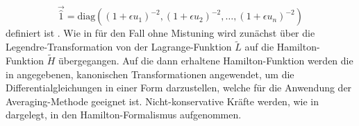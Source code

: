 \begin{equation}
	\vec{\hat{1}} =  \text{diag}\left(\left(1+\epsilon u_1 \right)^{-2},\left(1+\epsilon u_2 \right)^{-2}, \dots, \left(1+\epsilon u_n \right)^{-2} \right)
	\label{eq:SkalierteLagrangeFunktionfuerMehrereAbsorbersystemMassenmatrixMitMistuningDefVonI}
\end{equation}
%
definiert ist \cite{Mayet:CPVAMitMistuning}. 
%
%
%
Wie in  für den Fall ohne Mistuning wird zunächst über die Legendre-Transformation von 
der Lagrange-Funktion $\tilde{L}$ auf die Hamilton-Funktion $\tilde{H}$ übergegangen.
Auf die dann erhaltene Hamilton-Funktion werden die in  angegebenen, kanonischen Transformationen angewendet,
um die Differentialgleichungen in einer Form darzustellen,  welche für die Anwendung
der Averaging-Methode geeignet ist.
Nicht-konservative Kräfte werden, wie in  dargelegt, in den Hamilton-Formalismus aufgenommen.









